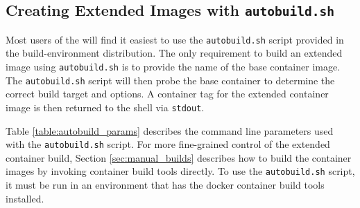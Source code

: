 \subsection{Creating Extended Images with \texttt{autobuild.sh}}

Most users of the \cxtoolkit will find it easiest to use the
\texttt{autobuild.sh} script provided in the build-environment
distribution.  The only requirement to build an extended image using
\texttt{autobuild.sh} is to provide the name of the base container image.
The \texttt{autobuild.sh} script will then probe the base container to
determine the correct build target and options.  A container tag
for the extended container image is then returned to the shell
via \texttt{stdout}.

Table \ref{table:autobuild_params} describes the command line parameters used
with the \texttt{autobuild.sh} script.  For more fine-grained control of the
extended container build, Section \ref{sec:manual_builds} describes how to build
the container images by invoking container build tools directly.  To use the
\texttt{autobuild.sh} script, it must be run in an environment that has the docker
container build tools installed.


